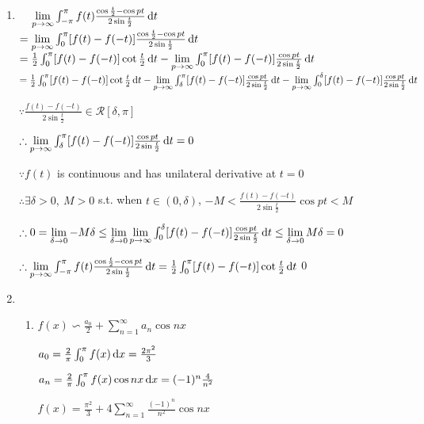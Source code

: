 \begin{enumerate}[1]
    \item 
    $\phantom{= }\, \lim \limits_{p \rightarrow \infty}\int_{-\pi}^{\pi}f(t)\frac{\cos\frac{t}{2}-\cos pt}{2\sin\frac{t}{2}}\dif t$\\
    $=\lim \limits_{p\rightarrow\infty}\int_{0}^{\pi}[f(t)-f(-t)]\frac{\cos\frac{t}{2}-\cos pt}{2\sin\frac{t}{2}}\dif t$\\
    $= \frac{1}{2}\int_{0}^{\pi}[f(t)-f(-t)]\cot \frac{t}{2}\dif t -\lim \limits_{p\rightarrow\infty}\int_{0}^{\pi}[f(t)-f(-t)]\frac{\cos pt}{2\sin\frac{t}{2}}\dif t$\\
    $= \frac{1}{2}\int_{0}^{\pi}[f(t)-f(-t)]\cot \frac{t}{2}\dif t -\lim \limits_{p \rightarrow \infty} \int_{\delta}^{\pi}[f(t)-f(-t)]\frac{\cos pt}{2\sin\frac{t}{2}}\dif t -\lim \limits_{p \rightarrow \infty} \int_{0}^{\delta}[f(t)-f(-t)]\frac{\cos pt}{2\sin\frac{t}{2}}\dif t$
    \par $\because \frac{f(t)-f(-t)}{2\sin\frac{t}{2}} \in \mathcal{R}[\delta,\pi]$
    \par $\therefore \lim \limits_{p \rightarrow \infty} \int_{\delta}^{\pi}[f(t)-f(-t)]\frac{\cos pt}{2\sin\frac{t}{2}}\dif t=0$
    \par $\because f(t)$ is continuous and has unilateral derivative at $t=0$
    \par $\therefore \exists \delta > 0,\ M>0$ s.t. when $t \in (0,\delta)$, $-M<\frac{f(t)-f(-t)}{2\sin\frac{t}{2}}\cos pt < M $
    \par $\therefore 0=\lim \limits_{\delta \rightarrow 0} -M\delta \leq  \lim \limits_{\delta \rightarrow 0} \lim \limits_{p \rightarrow \infty}  \int_{0}^{\delta}[f(t)-f(-t)]\frac{\cos pt}{2\sin\frac{t}{2}}\dif t\leq \lim \limits_{\delta \rightarrow 0}M\delta =0$
    \par $\therefore  \lim \limits_{p \rightarrow \infty}\int_{-\pi}^{\pi}f(t)\frac{\cos\frac{t}{2}-\cos pt}{2\sin\frac{t}{2}}\dif t = \frac{1}{2}\int_{0}^{\pi}[f(t)-f(-t)]\cot \frac{t}{2}\dif t$\qed

    \item 
    
    \begin{enumerate}[(1)]
        \item 
        \par $f(x)\backsim\frac{a_0}{2}+\sum \limits_{n=1}^{\infty}a_n\cos nx $
        \par $a_0=\frac{2}{\pi}\int_0^{\pi}f(x)\dif x=\frac{2\pi^2}{3}$
        \par $a_n=\frac{2}{\pi}\int_0^{\pi}f(x)\cos nx\dif x=(-1)^n\frac{4}{n^2}$
        \par $f(x) =  \frac{\pi^2}{3} + 4\sum \limits_{n=1}^{\infty} \frac{(-1)^n}{n^2} \cos nx$


\end{enumerate}
\end{enumerate}
